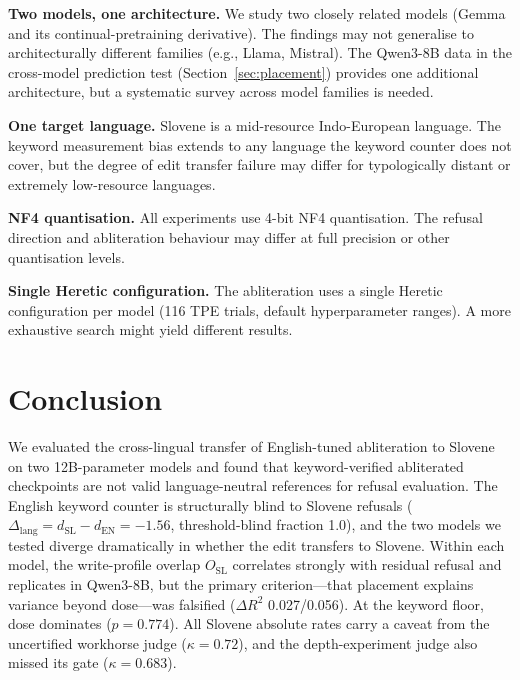 \documentclass[11pt,letterpaper]{article}
\begin{document}
\textbf{Two models, one architecture.} We study two closely related models (Gemma and its continual-pretraining derivative). The findings may not generalise to architecturally different families (e.g., Llama, Mistral). The Qwen3-8B data in the cross-model prediction test (Section~\ref{sec:placement}) provides one additional architecture, but a systematic survey across model families is needed.

\textbf{One target language.} Slovene is a mid-resource Indo-European language. The keyword measurement bias extends to any language the keyword counter does not cover, but the degree of edit transfer failure may differ for typologically distant or extremely low-resource languages.

\textbf{NF4 quantisation.} All experiments use 4-bit NF4 quantisation. The refusal direction and abliteration behaviour may differ at full precision or other quantisation levels.

\textbf{Single Heretic configuration.} The abliteration uses a single Heretic configuration per model (116 TPE trials, default hyperparameter ranges). A more exhaustive search might yield different results.

\section{Conclusion}

We evaluated the cross-lingual transfer of English-tuned abliteration to Slovene on two 12B-parameter models and found that keyword-verified abliterated checkpoints are not valid language-neutral references for refusal evaluation. The English keyword counter is structurally blind to Slovene refusals ($\Delta_{\mathrm{lang}} = d_{\mathrm{SL}} - d_{\mathrm{EN}} = -1.56$, threshold-blind fraction 1.0), and the two models we tested diverge dramatically in whether the edit transfers to Slovene. Within each model, the write-profile overlap $O_{\mathrm{SL}}$ correlates strongly with residual refusal and replicates in Qwen3-8B, but the primary criterion---that placement explains variance beyond dose---was falsified ($\Delta R^2$ 0.027/0.056). At the keyword floor, dose dominates ($p = 0.774$). All Slovene absolute rates carry a caveat from the uncertified workhorse judge ($\kappa = 0.72$), and the depth-experiment judge also missed its gate ($\kappa = 0.683$).



\end{document}
